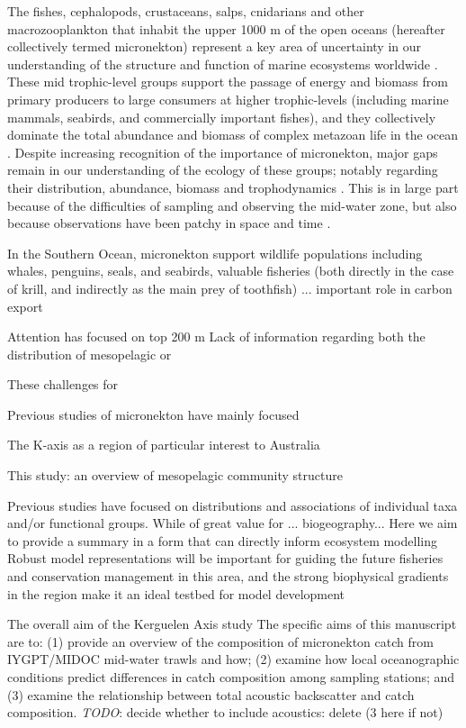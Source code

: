 \documentclass[12pt]{article}
\begin{document}
{The fishes, cephalopods, crustaceans, salps, cnidarians and other macrozooplankton that inhabit the upper 1000 m of the open oceans (hereafter collectively termed micronekton) represent a key area of uncertainty in our understanding of the structure and function of marine ecosystems worldwide \citep{StJohn:2016cr,Young:2015}.
These mid trophic-level groups support the passage of energy and biomass from primary producers to large consumers at higher trophic-levels (including marine mammals, seabirds, and commercially important fishes), and they collectively dominate the total abundance and biomass of complex metazoan life in the ocean \cite{BarOn:2018bj,Irigoien:2014}.
Despite increasing recognition of the importance of micronekton, major gaps remain in our understanding of the ecology of these groups; notably regarding their distribution, abundance, biomass and trophodynamics \cite{Young:2015,Newman:SOOS_CWP,Davison:2015fq}. 
This is in large part because of the difficulties of sampling and observing the mid-water zone, but also because observations have been patchy in space and time \cite{Kaartvedt:2012ji,Newman:SOOS_CWP}.

In the Southern Ocean, micronekton support wildlife populations including whales, penguins, seals, and seabirds, valuable fisheries (both directly in the case of krill, and indirectly as the main prey of toothfish) ... important role in carbon export

Attention has focused on top 200 m
Lack of information regarding both the distribution of mesopelagic or

These challenges for 

Previous studies of micronekton have mainly focused

The 
K-axis as a region of particular interest to Australia

This study: an overview of mesopelagic community structure

Previous studies have focused on distributions and associations of individual taxa and/or functional groups. 
While of great value for ... biogeography... 
Here we aim to provide a summary in a form that can directly inform ecosystem modelling 
Robust model representations will be important for guiding the future fisheries and conservation management in this area, and the strong biophysical gradients in the region make it an ideal testbed for model development

The overall aim of the Kerguelen Axis study
The specific aims of this manuscript are to: 
	(1) provide an overview of the composition of micronekton catch from IYGPT/MIDOC mid-water trawls and how;
	(2) examine how local oceanographic conditions predict differences in catch composition among sampling stations; and
	(3) examine the relationship between total acoustic backscatter and catch composition.
\emph{TODO}: decide whether to include acoustics: delete (3 here if not)


}
\end{document}
